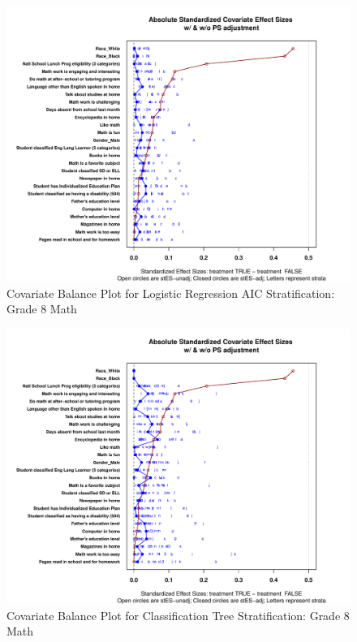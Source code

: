\begin{figure}
\begin{center}
\includegraphics[width=\textwidth]{../Figures2009/g8math-lrAIC-balance.pdf}
\caption{Covariate Balance Plot for Logistic Regression AIC Stratification: Grade 8 Math}
\end{center}
\end{figure}

\begin{figure}
\begin{center}
\includegraphics[width=\textwidth]{../Figures2009/g8math-tree-balance.pdf}
\caption{Covariate Balance Plot for Classification Tree Stratification: Grade 8 Math}
\end{center}
\end{figure}

